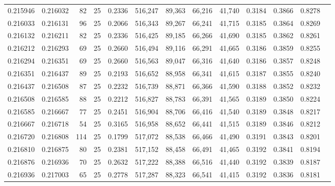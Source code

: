 \begin{tabular}{rrrrrrrrrrrrr}
0.215946 & 0.216032 &    82 &  25 &                                     0.2336 & 516,247 &  89,363 &  66,216 &  41,740 & 0.3184 & 0.3866 & 0.8278 \\
0.216033 & 0.216131 &    96 &  25 &                                     0.2066 & 516,343 &  89,267 &  66,241 &  41,715 & 0.3185 & 0.3864 & 0.8269 \\
0.216132 & 0.216211 &    82 &  25 &                                     0.2336 & 516,425 &  89,185 &  66,266 &  41,690 & 0.3185 & 0.3862 & 0.8261 \\
0.216212 & 0.216293 &    69 &  25 &                                     0.2660 & 516,494 &  89,116 &  66,291 &  41,665 & 0.3186 & 0.3859 & 0.8255 \\
0.216294 & 0.216351 &    69 &  25 &                                     0.2660 & 516,563 &  89,047 &  66,316 &  41,640 & 0.3186 & 0.3857 & 0.8248 \\
0.216351 & 0.216437 &    89 &  25 &                                     0.2193 & 516,652 &  88,958 &  66,341 &  41,615 & 0.3187 & 0.3855 & 0.8240 \\
0.216437 & 0.216508 &    87 &  25 &                                     0.2232 & 516,739 &  88,871 &  66,366 &  41,590 & 0.3188 & 0.3852 & 0.8232 \\
0.216508 & 0.216585 &    88 &  25 &                                     0.2212 & 516,827 &  88,783 &  66,391 &  41,565 & 0.3189 & 0.3850 & 0.8224 \\
0.216585 & 0.216667 &    77 &  25 &                                     0.2451 & 516,904 &  88,706 &  66,416 &  41,540 & 0.3189 & 0.3848 & 0.8217 \\
0.216667 & 0.216718 &    54 &  25 &                                     0.3165 & 516,958 &  88,652 &  66,441 &  41,515 & 0.3189 & 0.3846 & 0.8212 \\
0.216720 & 0.216808 &   114 &  25 &                                     0.1799 & 517,072 &  88,538 &  66,466 &  41,490 & 0.3191 & 0.3843 & 0.8201 \\
0.216810 & 0.216875 &    80 &  25 &                                     0.2381 & 517,152 &  88,458 &  66,491 &  41,465 & 0.3192 & 0.3841 & 0.8194 \\
0.216876 & 0.216936 &    70 &  25 &                                     0.2632 & 517,222 &  88,388 &  66,516 &  41,440 & 0.3192 & 0.3839 & 0.8187 \\
0.216936 & 0.217003 &    65 &  25 &                                     0.2778 & 517,287 &  88,323 &  66,541 &  41,415 & 0.3192 & 0.3836 & 0.8181 \\

\end{tabular}
